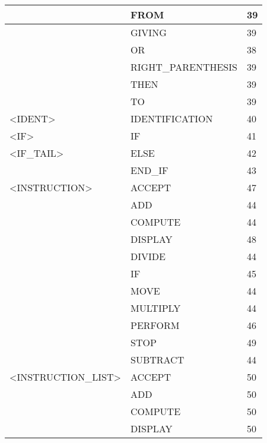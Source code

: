 \begin{longtable}{|l|l|l|}
                     &   FROM                 &   39 \\ \hline
                     &   GIVING               &   39 \\ \hline
                     &   OR                   &   38 \\ \hline
                     &   RIGHT\_PARENTHESIS   &   39 \\ \hline
                     &   THEN                 &   39 \\ \hline
                     &   TO                   &   39 \\ \hline
<IDENT>                                  &   IDENTIFICATION       &   40 \\ \hline
<IF>                                     &   IF                   &   41 \\ \hline
<IF\_TAIL>                               &   ELSE                 &   42 \\ \hline
                     &   END\_IF              &   43 \\ \hline
<INSTRUCTION>                            &   ACCEPT               &   47 \\ \hline
                     &   ADD                  &   44 \\ \hline
                     &   COMPUTE              &   44 \\ \hline
                     &   DISPLAY              &   48 \\ \hline
                     &   DIVIDE               &   44 \\ \hline
                     &   IF                   &   45 \\ \hline
                     &   MOVE                 &   44 \\ \hline
                     &   MULTIPLY             &   44 \\ \hline
                     &   PERFORM              &   46 \\ \hline
                     &   STOP                 &   49 \\ \hline
                     &   SUBTRACT             &   44 \\ \hline
<INSTRUCTION\_LIST>                      &   ACCEPT               &   50 \\ \hline
                     &   ADD                  &   50 \\ \hline
                     &   COMPUTE              &   50 \\ \hline
                     &   DISPLAY              &   50 \\ \hline

\end{longtable}
